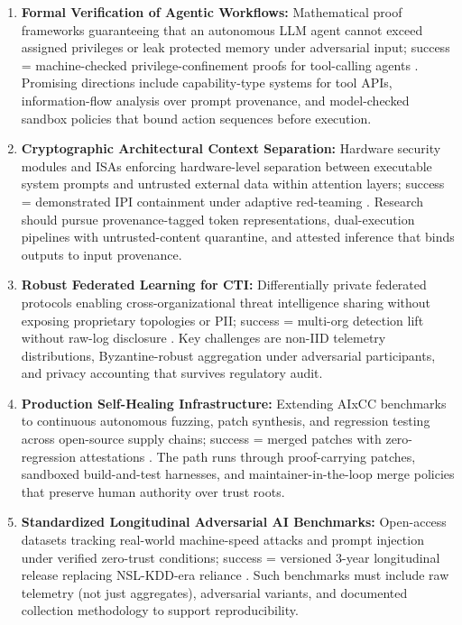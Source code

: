 \documentclass[conference,10pt,twocolumn,a4paper]{IEEEtran}
\begin{document}
\begin{enumerate}
    \item \textbf{Formal Verification of Agentic Workflows:} Mathematical proof frameworks guaranteeing that an autonomous LLM agent cannot exceed assigned privileges or leak protected memory under adversarial input; success = machine-checked privilege-confinement proofs for tool-calling agents \cite{xiang2026post, greshake2023indirect}. Promising directions include capability-type systems for tool APIs, information-flow analysis over prompt provenance, and model-checked sandbox policies that bound action sequences before execution.
    \item \textbf{Cryptographic Architectural Context Separation:} Hardware security modules and ISAs enforcing hardware-level separation between executable system prompts and untrusted external data within attention layers; success = demonstrated IPI containment under adaptive red-teaming \cite{xiang2026post, hines2026securing}. Research should pursue provenance-tagged token representations, dual-execution pipelines with untrusted-content quarantine, and attested inference that binds outputs to input provenance.
    \item \textbf{Robust Federated Learning for CTI:} Differentially private federated protocols enabling cross-organizational threat intelligence sharing without exposing proprietary topologies or PII; success = multi-org detection lift without raw-log disclosure \cite{nist_ir_8596_2025}. Key challenges are non-IID telemetry distributions, Byzantine-robust aggregation under adversarial participants, and privacy accounting that survives regulatory audit.
    \item \textbf{Production Self-Healing Infrastructure:} Extending AIxCC benchmarks to continuous autonomous fuzzing, patch synthesis, and regression testing across open-source supply chains; success = merged patches with zero-regression attestations \cite{darpa_aixcc_2025}. The path runs through proof-carrying patches, sandboxed build-and-test harnesses, and maintainer-in-the-loop merge policies that preserve human authority over trust roots.
    \item \textbf{Standardized Longitudinal Adversarial AI Benchmarks:} Open-access datasets tracking real-world machine-speed attacks and prompt injection under verified zero-trust conditions; success = versioned 3-year longitudinal release replacing NSL-KDD-era reliance \cite{nist_sp_ai_100_2e2025}. Such benchmarks must include raw telemetry (not just aggregates), adversarial variants, and documented collection methodology to support reproducibility.

\end{enumerate}
\end{document}
